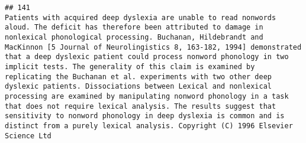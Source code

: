 \documentclass[
  english,
  man]{apa6}
\begin{document}
\begin{verbatim}
## 141                                                                                                                                                                                                                                                                                                                                                                                                                                                                                                                                                                                                                                                                                                                                                                                                                                                                                                                                                                                                                                                                                                                                                                                                                                                                                                                                                                                                                                                                                                                                                                                                                                                                                                                                                                                                                                             Patients with acquired deep dyslexia are unable to read nonwords aloud. The deficit has therefore been attributed to damage in nonlexical phonological processing. Buchanan, Hildebrandt and MacKinnon [5 Journal of Neurolingistics 8, 163-182, 1994] demonstrated that a deep dyslexic patient could process nonword phonology in two implicit tests. The generality of this claim is examined by replicating the Buchanan et al. experiments with two other deep dyslexic patients. Dissociations between Lexical and nonlexical processing are examined by manipulating nonword phonology in a task that does not require lexical analysis. The results suggest that sensitivity to nonword phonology in deep dyslexia is common and is distinct from a purely lexical analysis. Copyright (C) 1996 Elsevier Science Ltd

\end{verbatim}
\end{document}
